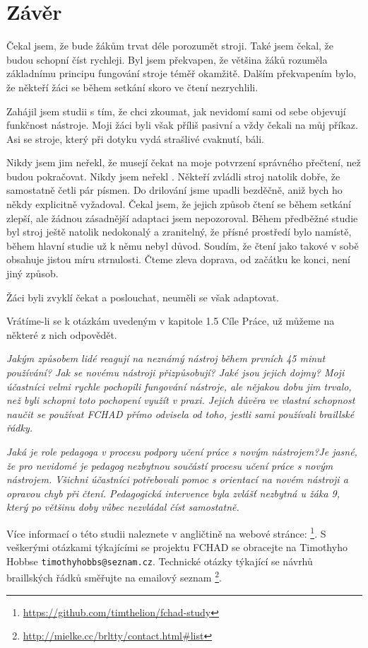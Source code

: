 \chapter{Závěr}
Čekal jsem, že bude žákům trvat déle porozumět stroji.  Také jsem čekal, že budou schopní číst rychleji. Byl jsem překvapen, že většina žáků rozuměla základnímu principu fungování stroje téměř okamžitě. Dalším překvapením bylo, že někteří žáci se během setkání skoro ve čtení nezrychlili.

Zahájil jsem studii s tím, že chci zkoumat, jak nevidomí sami od sebe objevují funkčnost nástroje. Moji žáci byli však příliš pasivní a vždy čekali na můj příkaz. Asi se stroje, který při dotyku vydá strašlivé cvaknutí, báli.

Nikdy jsem jim neřekl, že musejí čekat na moje potvrzení správného přečtení, než budou pokračovat. Nikdy jsem neřekl . Někteří zvládli stroj natolik dobře, že samostatně četli pár písmen. Do drilování jsme upadli bezděčně, aniž bych ho někdy explicitně vyžadoval. Čekal jsem, že jejich způsob čtení se během setkání zlepší, ale žádnou zásadnější adaptaci jsem nepozoroval. Během předběžné studie byl stroj ještě natolik nedokonalý a zranitelný, že přísné prostředí bylo namístě, během hlavní studie už k němu nebyl důvod. Soudím, že čtení jako takové v sobě obsahuje jistou míru strnulosti. Čteme zleva doprava, od začátku ke konci, není jiný způsob.

Žáci byli zvyklí čekat a poslouchat, neuměli se však adaptovat.

Vrátíme-li se k otázkám uvedeným v kapitole 1.5 Cíle Práce, už můžeme na některé z nich odpovědět.

\em Jakým způsobem lidé reagují na neznámý nástroj během prvních 45 minut používání? Jak se novému nástroji přizpůsobují? Jaké jsou jejich dojmy? \em  Moji účastníci velmi rychle pochopili fungování nástroje, ale nějakou dobu jim trvalo, než byli schopni toto pochopení využít v praxi.  Jejich důvěra ve vlastní schopnost naučit se používat FCHAD přímo odvisela od toho, jestli sami používali braillské řádky.

\em Jaká je role pedagoga v procesu podpory učení práce s novým nástrojem?\em Je jasné, že pro nevidomé je pedagog nezbytnou součástí procesu učení práce s novým nástrojem.  Všichni účastníci potřebovali pomoc s orientací na novém nástroji a opravou chyb při čtení.  Pedagogická intervence byla zvlášť nezbytná u žáka 9, který po většinu doby vůbec nezvládal číst samostatně.

Více informací o této studii naleznete v angličtině na webové stránce: \footnote{\url{https://github.com/timthelion/fchad-study}}.  S veškerými otázkami týkajícími se projektu FCHAD se obracejte na Timothyho Hobbse {\tt timothyhobbs@seznam.cz}.  Technické otázky týkající se návrhů braillských řádků směřujte na emailový seznam
\footnote{\url{ http://mielke.cc/brltty/contact.html#list}}.


